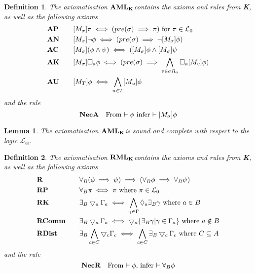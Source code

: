 \documentclass[12pt, a4paper, titlepage]{scrartcl}
\newtheorem{defn}{Definition}[subsection]
\newtheorem{lemma}{Lemma}[subsection]
\numberwithin{equation}{section}
\newcommand{\cover}{\bigtriangledown}
\newcommand{\sqex}[1]{[{#1}]}
\newcommand{\lang}{\mathcal{L}}
\newcommand{\langActEx}{\lang_{\otimes}}
\newcommand{\langProp}{\lang_0}
\newcommand{\AXK}{{\bf K}}
\newcommand{\AXAML}{${\bf AML_{\AXK}}$}
\newcommand{\AXRML}{${\bf RML_{\AXK}}$}
\newcommand{\axAN}{{\bf AN}}
\newcommand{\axAP}{{\bf AP}}
\newcommand{\axAC}{{\bf AC}}
\newcommand{\axAK}{{\bf AK}}
\newcommand{\axAU}{{\bf AU}}
\newcommand{\axNecA}{{\bf NecA}}
\newcommand{\axR}{{\bf R}}
\newcommand{\axRP}{{\bf RP}}
\newcommand{\axRK}{{\bf RK}}
\newcommand{\axRComm}{{\bf RComm}}
\newcommand{\axRDist}{{\bf RDist}}
\newcommand{\axNecR}{{\bf NecR}}
\begin{document}
\begin{defn} \label{axiomAML}
The axiomatisation \AXAML contains the axioms and rules from \AXK, as well as the following axioms
\begin{alignat*}{2}
	& \axAP && \quad \sqex{M_\sigma}\pi \iff (pre(\sigma) \implies \pi) \text{ for $\pi \in \langProp$}\\
	& \axAN && \quad \sqex{M_\sigma} \neg \phi \iff (pre(\sigma) \implies \neg \sqex{M_\sigma} \phi)\\
	& \axAC && \quad \sqex{M_\sigma}(\phi \land \psi) \iff (\sqex{M_\sigma}\phi \land \sqex{M_\sigma}\psi\\
	& \axAK && \quad \sqex{M_\sigma}\Box_a\phi \iff (pre(\sigma) \implies \bigwedge_{v \in \sigma R_a}
		\Box_a \sqex{M_v} \phi) \\
	& \axAU && \quad \sqex{M_T} \phi \iff \bigwedge_{u \in T} \sqex{M_u} \phi
\end{alignat*}
and the rule
\[
	\axNecA \quad \text{From $\vdash \phi$ infer $\vdash \sqex{M_\sigma} \phi$}
\]
\end{defn}

\begin{lemma} \label{axiomAMLSoundComplete}
The axiomatisation \AXAML is sound and complete with respect to the logic $\langActEx$.
\end{lemma}

\begin{defn} \label{axiomRML}
The axiomatisation \AXRML contains the axioms and rules from \AXK, as well as the following axioms
\begin{alignat*}{2}
	& \axR && \quad \forall_B (\phi \implies \psi) \implies (\forall_B \phi \implies \forall_B \psi) \\
	& \axRP && \quad \forall_B \pi \iff \pi \text{ where } \pi \in \langProp \\
	& \axRK && \quad\exists_B \cover_a \Gamma_a \iff \bigwedge_{\gamma \in \Gamma} \Diamond_a \exists_B
	\gamma \text{ where } a \in B \\
	& \axRComm && \quad \exists_B \cover_a \Gamma_a \iff \cover_a \{ \exists_B \gamma | \gamma \in
	\Gamma_a\} \text{ where } a \notin B\\
	& \axRDist && \quad \exists_B \bigwedge_{c \in C} \cover_c \Gamma_c \iff \bigwedge_{c \in C}
	\exists_B \cover_c \Gamma_c \text{ where } C \subseteq A
\end{alignat*}
and the rule
\[
	\axNecR \quad \text{From $\vdash \phi$, infer $\vdash \forall_B \phi$}
\]
\end{defn}
\end{document}
